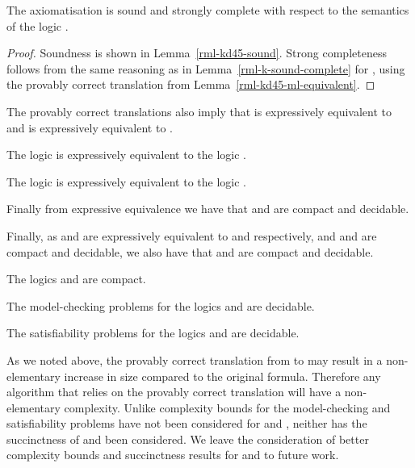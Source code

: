 \begin{theorem}\label{rml-kd45-sound-complete}
The axiomatisation \axiomRmlKFF{} is sound and strongly complete with respect to the semantics of the logic \logicRmlKD{}.
\end{theorem}

\begin{proof}
Soundness is shown in Lemma~\ref{rml-kd45-sound}.
Strong completeness follows from the same reasoning as in Lemma~\ref{rml-k-sound-complete} for \axiomRmlK{}, using the provably correct translation from Lemma~\ref{rml-kd45-ml-equivalent}.
\end{proof}

The provably correct translations also imply that \logicRmlKFF{} is expressively equivalent to \logicKFF{} and \logicRmlKD{} is expressively equivalent to \logicKD{}.

\begin{corollary}
The logic \logicRmlKFF{} is expressively equivalent to the logic \logicKFF{}.
\end{corollary}

\begin{corollary}
The logic \logicRmlKD{} is expressively equivalent to the logic \logicKD{}.
\end{corollary}

Finally from expressive equivalence we have that \logicRmlKFF{} and \logicRmlKD{} are compact and decidable.

Finally, as \logicRmlKFF{} and \logicRmlKD{} are expressively equivalent to \logicKFF{} and \logicKF{} respectively, and \logicKFF{} and \logicKD{} are compact and decidable, we also have that \logicRmlKFF{} and \logicRmlKD{} are compact and decidable.

\begin{corollary}
The logics \logicRmlKFF{} and \logicRmlKD{} are compact.
\end{corollary}

\begin{corollary}
The model-checking problems for the logics \logicRmlKFF{} and \logicRmlKD{} are decidable.
\end{corollary}

\begin{corollary}
The satisfiability problems for the logics \logicRmlKFF{} and \logicRmlKD{} are decidable.
\end{corollary}

As we noted above, the provably correct translation from \langRml{} to \langMl{} may result in a non-elementary increase in size compared to the original formula.
Therefore any algorithm that relies on the provably correct translation will have a non-elementary complexity.
Unlike \logicRmlK{} complexity bounds for the model-checking and satisfiability problems have not been considered for \logicRmlKFF{} and \logicRmlKD{}, neither has the succinctness of \logicRmlKFF{} and \logicRmlKD{} been considered.
We leave the consideration of better complexity bounds and succinctness results for \logicRmlKFF{} and \logicRmlKD{} to future work.
